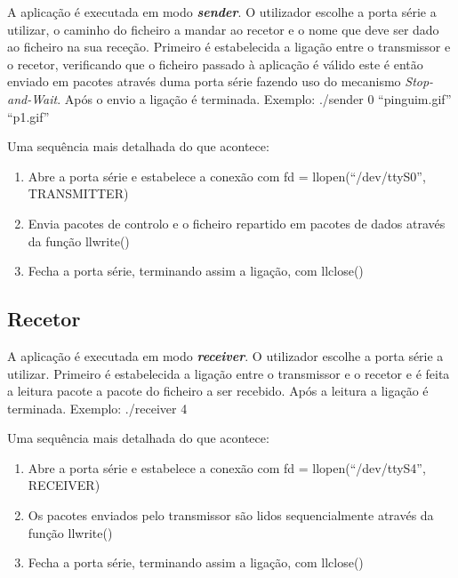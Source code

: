 \documentclass[a4paper,11pt,portuguese]{article}
\begin{document}
        A aplicação é executada em modo \textbf{\textit{sender}}. O utilizador escolhe a porta série a
        utilizar, o caminho do ficheiro a mandar ao recetor e o nome que deve ser dado ao ficheiro
        na sua receção. Primeiro é estabelecida a ligação entre o transmissor e o recetor, verificando
        que o ficheiro passado à aplicação é válido este é então enviado em pacotes através duma porta
        série fazendo uso do mecanismo \textit{Stop-and-Wait}. Após o envio a ligação é terminada.
        Exemplo: \hfill \break
        ./sender 0 ``pinguim.gif'' ``p1.gif''

        \hfill \break
        \noindent Uma sequência mais detalhada do que acontece:
        \begin{enumerate}
            \item Abre a porta série e estabelece a conexão com fd = llopen(``/dev/ttyS0'', TRANSMITTER)
            \item Envia pacotes de controlo e o ficheiro repartido em pacotes de dados através da função llwrite()
            \item Fecha a porta série, terminando assim a ligação, com llclose()
        \end{enumerate}

    \subsection{Recetor}

        A aplicação é executada em modo \textbf{\textit{receiver}}. O utilizador escolhe a porta série a
        utilizar. Primeiro é estabelecida a ligação entre o transmissor e o recetor e é feita a leitura
        pacote a pacote do ficheiro a ser recebido. Após a leitura a ligação é terminada. Exemplo: \hfill \break
        ./receiver 4

        \hfill \break
        \noindent Uma sequência mais detalhada do que acontece:
        \begin{enumerate}
            \item Abre a porta série e estabelece a conexão com fd = llopen(``/dev/ttyS4'', RECEIVER)
            \item Os pacotes enviados pelo transmissor são lidos sequencialmente através da função llwrite()
            \item Fecha a porta série, terminando assim a ligação, com llclose()
        \end{enumerate}


\end{document}

